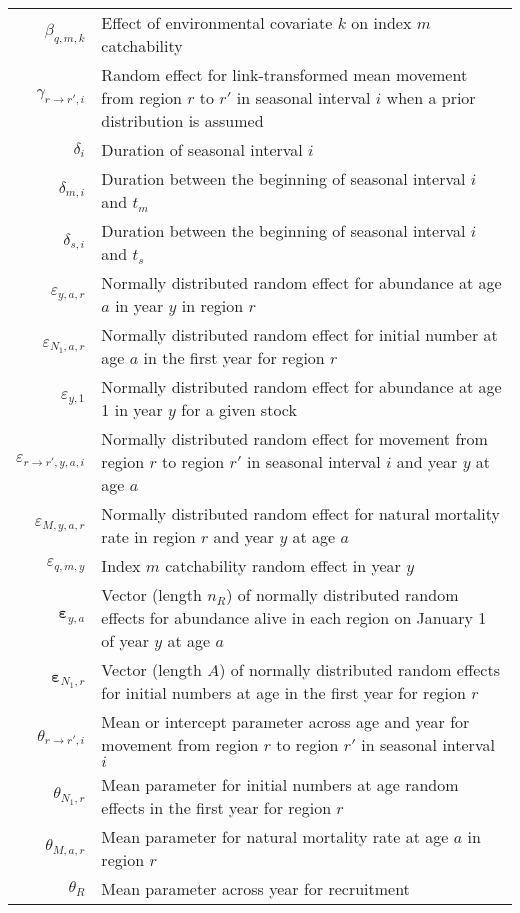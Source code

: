 \begin{longtable}[c]{r p{}}
$\beta_{q,m,k}$ & Effect of environmental covariate $k$ on index $m$ catchability\\
$\gamma_{r\rightarrow r',i}$ & Random effect for link-transformed mean movement from region $r$ to $r'$ in seasonal interval $i$ when a prior distribution is assumed\\
$\delta_i$ & Duration of seasonal interval $i$\\
$\delta_{m,i}$ & Duration between the beginning of seasonal interval $i$ and $t_m$\\
$\delta_{s,i}$ & Duration between the beginning of seasonal interval $i$ and $t_s$ \\
$\varepsilon_{y,a,r}$ & Normally distributed random effect for abundance at age $a$ in year $y$ in region $r$\\
$\varepsilon_{N_1,a,r}$ & Normally distributed random effect for initial number at age $a$ in the first year for region $r$\\ 
$\varepsilon_{y,1}$ & Normally distributed random effect for abundance at age 1 in year $y$ for a given stock\\
$\varepsilon_{r\rightarrow r',y,a,i}$ & Normally distributed random effect for movement from region $r$ to region $r'$ in seasonal interval $i$ and year $y$ at age $a$\\
$\varepsilon_{M,y,a,r}$ & Normally distributed random effect for natural mortality rate in region $r$ and year $y$ at age $a$\\
$\varepsilon_{q,m,y}$ & Index $m$ catchability random effect in year $y$\\
$\boldsymbol{\varepsilon}_{y,a}$ & Vector (length $n_R$) of normally distributed random effects for abundance alive in each region on January 1 of year $y$ at age $a$\\
$\boldsymbol{\varepsilon}_{N_1,r}$ & Vector (length $A$) of normally distributed random effects for initial numbers at age in the first year for region $r$\\ 
$\theta_{r\rightarrow r',i}$ & Mean or intercept parameter across age and year for movement from region $r$ to region $r'$ in seasonal interval $i$\\
$\theta_{N_1,r}$ & Mean parameter for initial numbers at age random effects in the first year for region $r$\\
$\theta_{M,a,r}$ & Mean parameter for natural mortality rate at age $a$ in region $r$\\
$\theta_{R}$ & Mean parameter across year for recruitment\\

\end{longtable}
